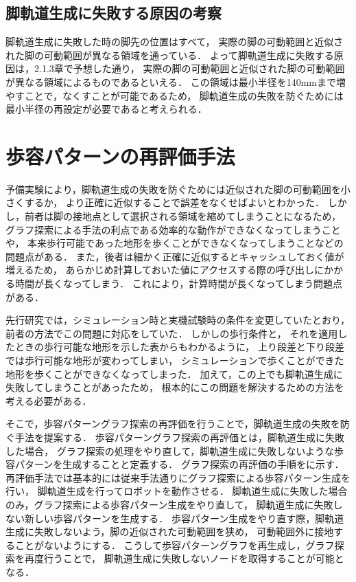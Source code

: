 \subsection{脚軌道生成に失敗する原因の考察}
脚軌道生成に失敗した時の脚先の位置はすべて，
実際の脚の可動範囲と近似された脚の可動範囲が異なる領域を通っている．
よって脚軌道生成に失敗する原因は，2.1.3章で予想した通り，
実際の脚の可動範囲と近似された脚の可動範囲が異なる領域によるものであるといえる．
この領域は最小半径を140mmまで増やすことで，なくすことが可能であるため，
脚軌道生成の失敗を防ぐためには最小半径の再設定が必要であると考えられる．

\section{歩容パターンの再評価手法}
予備実験により，脚軌道生成の失敗を防ぐためには近似された脚の可動範囲を小さくするか，
より正確に近似することで誤差をなくせばよいとわかった．
しかし，前者は脚の接地点として選択される領域を縮めてしまうことになるため，
グラフ探索による手法の利点である効率的な動作ができなくなってしまうことや，
本来歩行可能であった地形を歩くことができなくなってしまうことなどの問題点がある．
また，後者は細かく正確に近似するとキャッシュしておく値が増えるため，
あらかじめ計算しておいた値にアクセスする際の呼び出しにかかる時間が長くなってしまう．
これにより，計算時間が長くなってしまう問題点がある．

先行研究では，シミュレーション時と実機試験時の条件を変更していたとおり，
前者の方法でこの問題に対応をしていた．
しかしの歩行条件と，
それを適用したときの歩行可能な地形を示した表からもわかるように，
上り段差と下り段差では歩行可能な地形が変わってしまい，
シミュレーションで歩くことができた地形を歩くことができなくなってしまった．
加えて，この上でも脚軌道生成に失敗してしまうことがあったため，
根本的にこの問題を解決するための方法を考える必要がある．

そこで，歩容パターングラフ探索の再評価を行うことで，脚軌道生成の失敗を防ぐ手法を提案する．
歩容パターングラフ探索の再評価とは，脚軌道生成に失敗した場合，
グラフ探索の処理をやり直して，脚軌道生成に失敗しないような歩容パターンを生成することと定義する．
グラフ探索の再評価の手順をに示す．
再評価手法では基本的には従来手法通りにグラフ探索による歩容パターン生成を行い，
脚軌道生成を行ってロボットを動作させる．
脚軌道生成に失敗した場合のみ，グラフ探索による歩容パターン生成をやり直して，
脚軌道生成に失敗しない新しい歩容パターンを生成する．
歩容パターン生成をやり直す際，脚軌道生成に失敗しないよう，脚の近似された可動範囲を狭め，
可動範囲外に接地することがないようにする．
こうして歩容パターングラフを再生成し，グラフ探索を再度行うことで，
脚軌道生成に失敗しないノードを取得することが可能となる．

